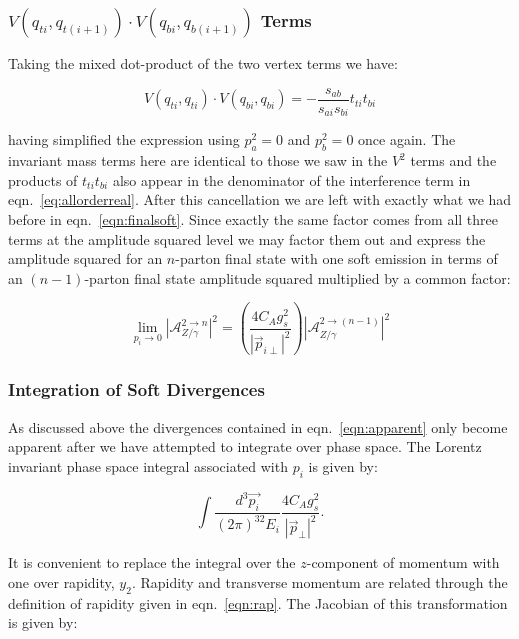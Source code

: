 		\subsubsection{$V(q_{ti}, q_{t(i+1)})\cdot V(q_{bi}, q_{b(i+1)})$ Terms}
			\label{sub:subsection_name}

			Taking the mixed dot-product of the two vertex terms we have:

			\begin{equation}
				V(q_{ti}, q_{ti})\cdot V(q_{bi}, q_{bi}) = -\frac{s_{ab}}{s_{ai}s_{bi}}t_{ti}t_{bi}
			\end{equation}

			having simplified the expression using $p_a^2=0$ and $p_b^2=0$ once again.  The invariant mass terms
			here are identical to those we saw in the $V^2$ terms and the products of $t_{ti}t_{bi}$ also appear
			in the denominator of the interference term in eqn.~\eqref{eq:allorderreal}.
			After this cancellation we are left with exactly what we had before in eqn.~\eqref{eqn:finalsoft}.
			Since exactly the same factor comes from all three terms at the amplitude squared level we may factor
			them out and express the amplitude squared for an $n$-parton final state with one soft emission in
			terms of an $(n-1)$-parton final state amplitude squared multiplied by a common factor:

			\begin{equation}
				\lim_{p_i\rightarrow0} |\mathcal{A}_{Z/\gamma}^{2\rightarrow n}|^2 = \left(\frac{4C_Ag_s^2}{|\vec{p}_{i\perp}|^2}\right)
					|\mathcal{A}_{Z/\gamma}^{2\rightarrow (n-1)}|^2
				\label{eqn:apparent}
			\end{equation}

		\subsubsection{Integration of Soft Divergences}
			\label{sub:subsection_name}

			As discussed above the divergences contained in eqn.~\eqref{eqn:apparent} only become
			apparent after we have attempted to integrate over phase space.  The Lorentz
			invariant phase space integral associated with $p_i$ is given by:

			\begin{equation}
				\int\frac{d^3\vec{p_i}}{(2\pi)^32E_i}\frac{4C_Ag_s^2}{|\vec{p}_\perp|^2}.
			\end{equation}

			It is convenient to replace the integral over the $z$-component of momentum with one over rapidity,
			$y_2$.  Rapidity and transverse momentum are related through the definition of rapidity given
			in eqn.~\eqref{eqn:rap}.  The Jacobian of this transformation is given by:

